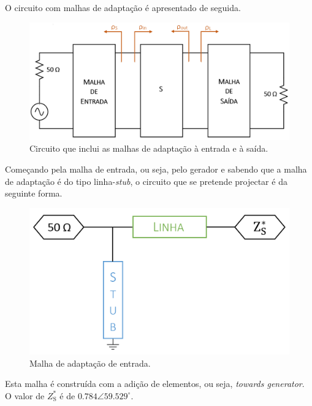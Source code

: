 \documentclass[11pt]{article}
\numberwithin{equation}{section}
\begin{document}
\vspace{1mm} 
O circuito com malhas de adaptação é apresentado de seguida.

\begin{figure}[H]
	\centering
	\includegraphics[keepaspectratio=true, scale=0.40]{teoricas/malhas}
	\vspace{-0.5em}
	\caption{Circuito que inclui as malhas de adaptação à entrada e à saída.}
	\vspace{-0.8em}
\end{figure}

Começando pela malha de entrada, ou seja, pelo gerador e sabendo que a malha de adaptação é do tipo linha-\textit{stub}, o circuito que se pretende projectar é da seguinte forma.

\begin{figure}[H]
	\centering
	\includegraphics[keepaspectratio=true, scale=0.25]{teoricas/malhaentrada}
	\vspace{-0.5em}
	\caption{Malha de adaptação de entrada.}
	\vspace{-0.8em}
\end{figure}

Esta malha é construída com a adição de elementos, ou seja, \textit{towards generator}. O valor de $Z_{\text{S}}^{*}$ é de $0.784\angle59.529 ^{\circ}$.
\end{document}
